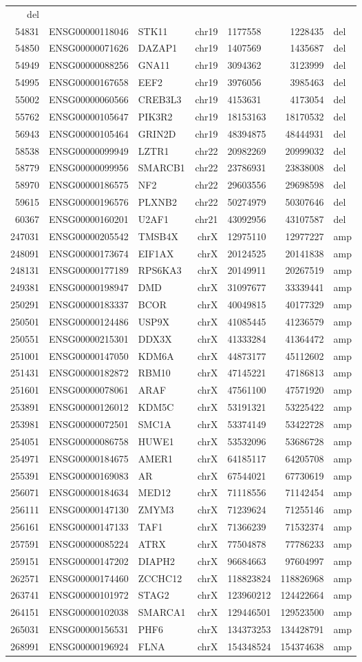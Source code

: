 \documentclass[]{article}
\begin{document}
\begin{longtable}[]{@{}rrlrlrl@{}}
del\tabularnewline
54831 & ENSG00000118046 & STK11 & chr19 & 1177558 & 1228435 &
del\tabularnewline
54850 & ENSG00000071626 & DAZAP1 & chr19 & 1407569 & 1435687 &
del\tabularnewline
54949 & ENSG00000088256 & GNA11 & chr19 & 3094362 & 3123999 &
del\tabularnewline
54995 & ENSG00000167658 & EEF2 & chr19 & 3976056 & 3985463 &
del\tabularnewline
55002 & ENSG00000060566 & CREB3L3 & chr19 & 4153631 & 4173054 &
del\tabularnewline
55762 & ENSG00000105647 & PIK3R2 & chr19 & 18153163 & 18170532 &
del\tabularnewline
56943 & ENSG00000105464 & GRIN2D & chr19 & 48394875 & 48444931 &
del\tabularnewline
58538 & ENSG00000099949 & LZTR1 & chr22 & 20982269 & 20999032 &
del\tabularnewline
58779 & ENSG00000099956 & SMARCB1 & chr22 & 23786931 & 23838008 &
del\tabularnewline
58970 & ENSG00000186575 & NF2 & chr22 & 29603556 & 29698598 &
del\tabularnewline
59615 & ENSG00000196576 & PLXNB2 & chr22 & 50274979 & 50307646 &
del\tabularnewline
60367 & ENSG00000160201 & U2AF1 & chr21 & 43092956 & 43107587 &
del\tabularnewline
247031 & ENSG00000205542 & TMSB4X & chrX & 12975110 & 12977227 &
amp\tabularnewline
248091 & ENSG00000173674 & EIF1AX & chrX & 20124525 & 20141838 &
amp\tabularnewline
248131 & ENSG00000177189 & RPS6KA3 & chrX & 20149911 & 20267519 &
amp\tabularnewline
249381 & ENSG00000198947 & DMD & chrX & 31097677 & 33339441 &
amp\tabularnewline
250291 & ENSG00000183337 & BCOR & chrX & 40049815 & 40177329 &
amp\tabularnewline
250501 & ENSG00000124486 & USP9X & chrX & 41085445 & 41236579 &
amp\tabularnewline
250551 & ENSG00000215301 & DDX3X & chrX & 41333284 & 41364472 &
amp\tabularnewline
251001 & ENSG00000147050 & KDM6A & chrX & 44873177 & 45112602 &
amp\tabularnewline
251431 & ENSG00000182872 & RBM10 & chrX & 47145221 & 47186813 &
amp\tabularnewline
251601 & ENSG00000078061 & ARAF & chrX & 47561100 & 47571920 &
amp\tabularnewline
253891 & ENSG00000126012 & KDM5C & chrX & 53191321 & 53225422 &
amp\tabularnewline
253981 & ENSG00000072501 & SMC1A & chrX & 53374149 & 53422728 &
amp\tabularnewline
254051 & ENSG00000086758 & HUWE1 & chrX & 53532096 & 53686728 &
amp\tabularnewline
254971 & ENSG00000184675 & AMER1 & chrX & 64185117 & 64205708 &
amp\tabularnewline
255391 & ENSG00000169083 & AR & chrX & 67544021 & 67730619 &
amp\tabularnewline
256071 & ENSG00000184634 & MED12 & chrX & 71118556 & 71142454 &
amp\tabularnewline
256111 & ENSG00000147130 & ZMYM3 & chrX & 71239624 & 71255146 &
amp\tabularnewline
256161 & ENSG00000147133 & TAF1 & chrX & 71366239 & 71532374 &
amp\tabularnewline
257591 & ENSG00000085224 & ATRX & chrX & 77504878 & 77786233 &
amp\tabularnewline
259151 & ENSG00000147202 & DIAPH2 & chrX & 96684663 & 97604997 &
amp\tabularnewline
262571 & ENSG00000174460 & ZCCHC12 & chrX & 118823824 & 118826968 &
amp\tabularnewline
263741 & ENSG00000101972 & STAG2 & chrX & 123960212 & 124422664 &
amp\tabularnewline
264151 & ENSG00000102038 & SMARCA1 & chrX & 129446501 & 129523500 &
amp\tabularnewline
265031 & ENSG00000156531 & PHF6 & chrX & 134373253 & 134428791 &
amp\tabularnewline
268991 & ENSG00000196924 & FLNA & chrX & 154348524 & 154374638 &
amp\tabularnewline
\bottomrule
\end{longtable}
\end{document}
